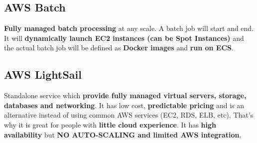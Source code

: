 \subsection{AWS Batch}\label{subsec:aws-batch}
\textbf{Fully managed batch processing} at any scale.
A batch job will start and end.
It will \textbf{dynamically launch EC2 instances (can be Spot Instances)} and the actual batch job will be defined as \textbf{Docker images} and \textbf{run on ECS}\@.

\subsection{AWS LightSail}\label{subsec:aws-lightsail}
Standalone service which \textbf{provide fully managed virtual servers, storage, databases and networking}\@.
It has low cost, \textbf{predictable pricing} and is an alternative instead of using common AWS services (EC2, RDS, ELB, etc).
That's why it is great for people with \textbf{little cloud experience}.
It has \textbf{high availability} but \textbf{NO AUTO-SCALING and limited AWS integration}.
